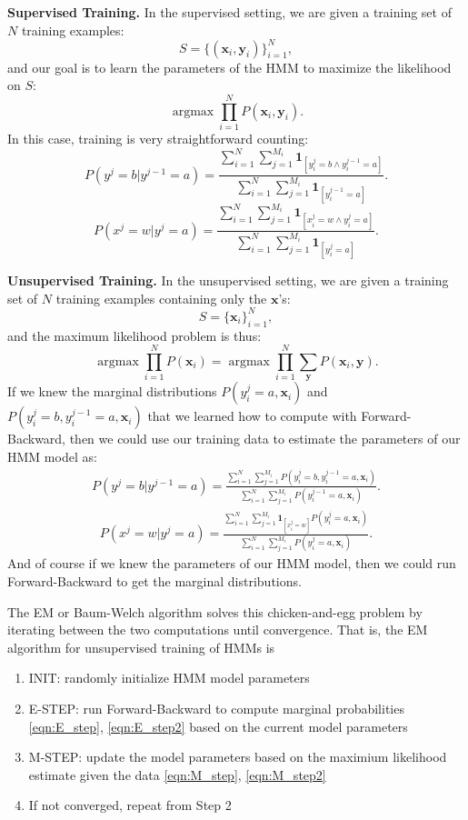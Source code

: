 \documentclass{article}
\DeclareMathOperator{\argmax}{argmax}
\newcommand{\x}{\textbf{x}}
\newcommand{\y}{\textbf{y}}
\begin{document}
\textbf{Supervised Training.}
In the supervised setting, we are given a training set of $N$ training examples:  
$$S = \{(\x_i,\y_i)\}_{i=1}^N,$$
and our goal is to learn the parameters of the HMM to maximize the likelihood on $S$:
$$\argmax \prod_{i=1}^N P(\x_i,\y_i).$$
In this case, training is very straightforward counting:
$$P(y^j=b|y^{j-1}=a) = \frac{\sum_{i=1}^N\sum_{j=1}^{M_i} \textbf{1}_{[y_i^j=b \wedge y_i^{j-1} = a]}}{\sum_{i=1}^N\sum_{j=1}^{M_i} \textbf{1}_{[y_i^{j-1} = a]}}.$$
$$P(x^j=w|y^{j}=a) = \frac{\sum_{i=1}^N\sum_{j=1}^{M_i} \textbf{1}_{[x_i^j=w \wedge y_i^{j} = a]}}{\sum_{i=1}^N\sum_{j=1}^{M_i} \textbf{1}_{[y_i^{j} = a]}}.$$

\textbf{Unsupervised Training.}
In the unsupervised setting, we are given a training set of $N$ training examples  containing only the $\x$'s:
$$S = \{\x_i\}_{i=1}^N,$$
and the maximum likelihood problem is thus:
$$\argmax \prod_{i=1}^N P(\x_i)=\argmax \prod_{i=1}^N \sum_\y P(\x_i,\y).$$
If we knew the marginal distributions $P( y_i^{j} = a,\x_i)$ and $P(y_i^j=b ,y_i^{j-1} = a, \x_i)$ that we learned how to compute with Forward-Backward, then we could use our training data to estimate the parameters of our HMM model as:
\begin{eqnarray}P(y^j=b|y^{j-1}=a) = \frac{\sum_{i=1}^N\sum_{j=1}^{M_i} P(y_i^j=b ,y_i^{j-1} = a, \x_i)}{\sum_{i=1}^N\sum_{j=1}^{M_i} P(y_i^{j-1}=a,\x_i)}.\label{eqn:M_step}\end{eqnarray}
\begin{eqnarray}P(x^j=w|y^{j}=a) = \frac{\sum_{i=1}^N\sum_{j=1}^{M_i} \textbf{1}_{[x_i^j=w]} P( y_i^{j} = a,\x_i)}{\sum_{i=1}^N\sum_{j=1}^{M_i} P(y_i^{j} = a,\x_i)}.\label{eqn:M_step2}\end{eqnarray}
And of course if we knew the parameters of our HMM model, then we could run Forward-Backward to get the marginal distributions.

The EM or Baum-Welch algorithm solves this chicken-and-egg problem by iterating between the two computations until convergence.  That is, the EM algorithm for unsupervised training of HMMs is
\begin{enumerate}
\item INIT: randomly initialize HMM model parameters
\item E-STEP: run Forward-Backward to compute marginal probabilities \eqref{eqn:E_step}, \eqref{eqn:E_step2} based on the current model parameters
\item M-STEP: update the model parameters based on the maximium likelihood estimate given the data \eqref{eqn:M_step}, \eqref{eqn:M_step2}
\item If not converged, repeat from Step 2
\end{enumerate}
\end{document}
